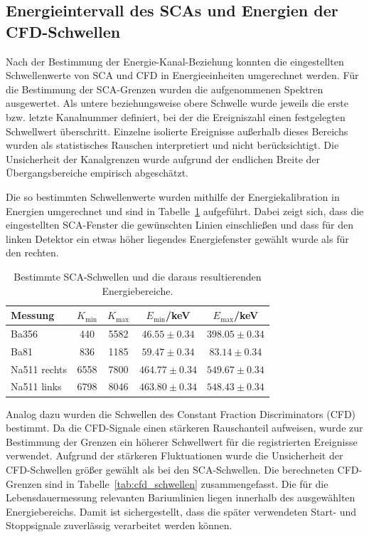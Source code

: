 \subsection{Energieintervall des SCAs und Energien der CFD-Schwellen}

Nach der Bestimmung der Energie-Kanal-Beziehung konnten die eingestellten Schwellenwerte von SCA und CFD in Energieeinheiten umgerechnet werden. 
Für die Bestimmung der SCA-Grenzen wurden die aufgenommenen Spektren ausgewertet. 
Als untere beziehungsweise obere Schwelle wurde jeweils die erste bzw. letzte Kanalnummer definiert, bei der die Ereigniszahl einen festgelegten Schwellwert überschritt. 
Einzelne isolierte Ereignisse außerhalb dieses Bereichs wurden als statistisches Rauschen interpretiert und nicht berücksichtigt. 
Die Unsicherheit der Kanalgrenzen wurde aufgrund der endlichen Breite der Übergangsbereiche empirisch abgeschätzt. 

Die so bestimmten Schwellenwerte wurden mithilfe der Energiekalibration in Energien umgerechnet und sind in Tabelle~\ref{tab:sca_schwellen} aufgeführt. 
Dabei zeigt sich, dass die eingestellten SCA-Fenster die gewünschten Linien einschließen und dass für den linken Detektor ein etwas höher liegendes Energiefenster gewählt wurde als für den rechten. 

\begin{table}[htbp] 
    \centering 
    \caption{Bestimmte SCA-Schwellen und die daraus resultierenden Energiebereiche.} 
    \label{tab:sca_schwellen} 
    \begin{tabular}{l c c c c} 
        \hline 
        Messung & $K_{\min}$ & $K_{\max}$ & $E_{\min}$/keV & $E_{\max}$/keV \\ 
        \hline 
        Ba356 & 440 & 5582 & $46.55 \pm 0.34$ & $398.05 \pm 0.34$ \\ 
        Ba81 & 836 & 1185 & $59.47 \pm 0.34$ & $83.14 \pm 0.34$ \\ 
        Na511 rechts & 6558 & 7800 & $464.77 \pm 0.34$ & $549.67 \pm 0.34$ \\ 
        Na511 links & 6798 & 8046 & $463.80 \pm 0.34$ & $548.43 \pm 0.34$ \\ 
        \hline 
    \end{tabular} 
\end{table} 

Analog dazu wurden die Schwellen des Constant Fraction Discriminators (CFD) bestimmt. 
Da die CFD-Signale einen stärkeren Rauschanteil aufweisen, wurde zur Bestimmung der Grenzen ein höherer Schwellwert für die registrierten Ereignisse verwendet. 
Aufgrund der stärkeren Fluktuationen wurde die Unsicherheit der CFD-Schwellen größer gewählt als bei den SCA-Schwellen. 
Die berechneten CFD-Grenzen sind in Tabelle~\ref{tab:cfd_schwellen} zusammengefasst. 
Die für die Lebensdauermessung relevanten Bariumlinien liegen innerhalb des ausgewählten Energiebereichs. 
Damit ist sichergestellt, dass die später verwendeten Start- und Stoppsignale zuverlässig verarbeitet werden können. 


